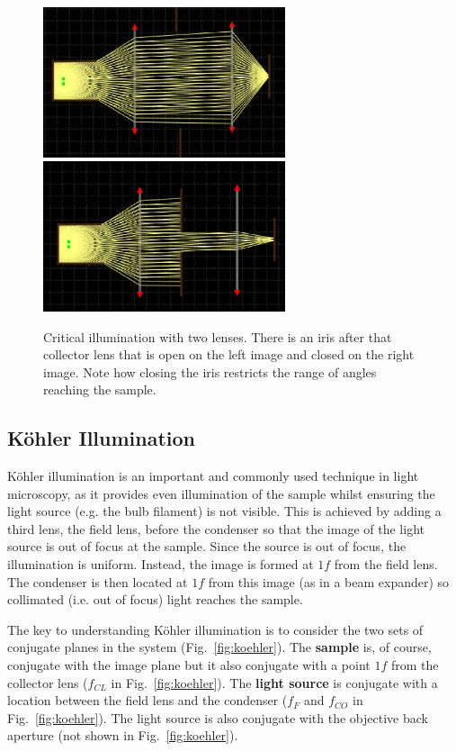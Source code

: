 \documentclass[a4paper]{report}
\begin{document}
\begin{figure}[h]
\center
\includegraphics[width=2.8in]{critical_open_iris.eps}
\includegraphics[width=2.8in]{critical_closed_iris.eps}
\caption{Critical illumination with two lenses. 
There is an iris after that collector lens that is open on the left image and closed on the right image. 
Note how closing the iris restricts the range of angles reaching the sample.}
\label{fig:critical_iris}
\end{figure}



\clearpage

\subsection{K\"{o}hler Illumination}
K\"{o}hler illumination is an important and commonly used technique in light microscopy, as it provides even illumination of the sample whilst ensuring the light source (e.g. the bulb filament) is not visible. 
This is achieved by adding a third lens, the field lens, before the condenser so that the image of the light source is out of focus at the sample. 
Since the source is out of focus, the illumination is uniform. 
Instead, the image is formed at $1f$ from the field lens. 
The condenser is then located at $1f$ from this image (as in a beam expander) so collimated (i.e. out of focus) light reaches the sample. 

The key to understanding K\"{o}hler illumination is to consider the two sets of conjugate planes in the system (Fig.~\ref{fig:koehler}). 
The \textbf{sample} is, of course, conjugate with the image plane but it also conjugate with a point $1f$ from the collector lens ($f_{CL}$ in Fig.~\ref{fig:koehler}). 
The \textbf{light source} is conjugate with a location between the field lens and the condenser ($f_F$ and $f_{CO}$ in Fig.~\ref{fig:koehler}). 
The light source is also conjugate with the objective back aperture (not shown in Fig.~\ref{fig:koehler}). 
\end{document}
